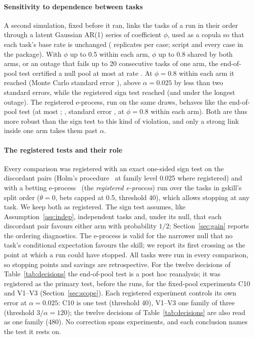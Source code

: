 \documentclass[sigconf,review,anonymous]{acmart}
\begin{document}
\paragraph{Sensitivity to dependence between tasks}
A second simulation, fixed before it ran, links the tasks of a run in their order through a latent
Gaussian AR(1) series of coefficient $\phi$, used as a copula so that each task's base rate is
unchanged (\ndepReps{} replicates per case; script and every case in the package). With
$\phi$ up to 0.5 within each arm, $\phi$ up to 0.8 shared by both arms, or an outage that
fails up to 20 consecutive tasks of one arm, the end-of-pool test certified a null pool at most at
rate \ndepEopMild{}. At $\phi=0.8$ within each arm it reached \ndepEopStrong{} (Monte Carlo
standard error \ndepEopStrongSe{}), above $\alpha=0.025$ by less than two standard errors, while the registered sign test reached \ndepSignStrong{} (and \ndepSignBlock{} under the
longest outage). The registered e-process, run on the same draws, behaves like the end-of-pool test
(at most \ndepEpMild{}; \ndepEpStrong{}, standard error \ndepEpStrongSe{}, at $\phi=0.8$ within
each arm). Both are thus more robust than the sign test to this kind of violation, and only a
strong link inside one arm takes them past $\alpha$.

\paragraph{The registered tests and their role}
Every comparison was registered with an exact one-sided sign test on the discordant pairs (Holm's
procedure~\cite{holm} at family level 0.025 where registered) and with a betting
e-process~\cite{waudby_smith_ramdas} (the \emph{registered e-process}) run over the tasks in gskill's split order ($\theta=0$,
bets capped at 0.5, threshold 40), which allows stopping at any task. We keep both as registered. The sign test assumes, like
Assumption~\ref{ass:indep}, independent tasks and, under its null, that each discordant pair favours
either arm with probability $1/2$; Section~\ref{sec:gain} reports the ordering diagnostics. The
e-process is valid for the narrower null that no task's conditional expectation favours the skill;
we report its first crossing as the point at which a run could have stopped. All tasks were run in
every comparison, so stopping points and savings are retrospective. For the twelve decisions of
Table~\ref{tab:decisions} the end-of-pool test is a post hoc reanalysis; it was registered as the
primary test, before the runs, for the fixed-pool experiments C10 and V1--V3 (Section~\ref{sec:scope}).
Each registered experiment controls its own error at $\alpha=0.025$: C10 is one test (threshold 40),
V1--V3 one family of three (threshold $3/\alpha=120$); the twelve decisions of
Table~\ref{tab:decisions} are also read as one family (480). No correction spans experiments, and
each conclusion names the test it rests on.
\end{document}
